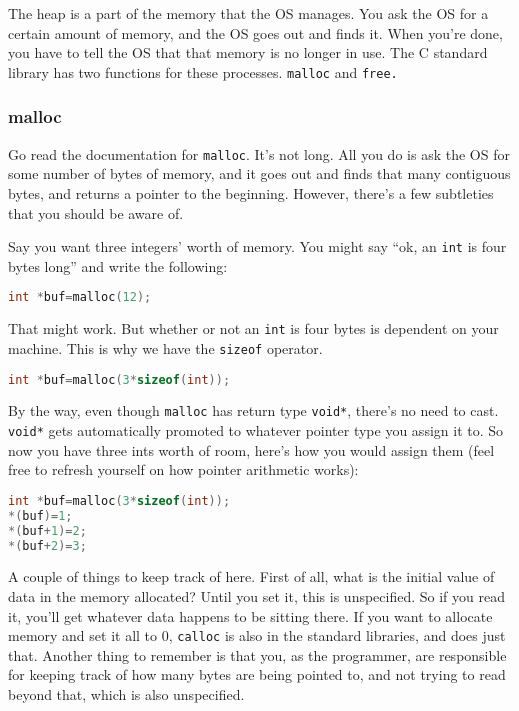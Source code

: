 \documentclass[ebook,11pt,oneside,openany]{memoir}
\begin{document}
The heap is a part of the memory that the OS manages. You ask the OS for a certain amount of memory, and the OS goes out and finds it. When you're done, you have to tell the OS that that memory is no longer in use. The C standard library has two functions for these processes. \texttt{malloc} and \texttt{free.}
\subsubsection{malloc}
Go read the documentation for \texttt{malloc}. It's not long. All you do is ask the OS for some number of bytes of memory, and it goes out and finds that many contiguous bytes, and returns a pointer to the beginning. However, there's a few subtleties that you should be aware of.

Say you want three integers' worth of memory. You might say ``ok, an \texttt{int} is four bytes long'' and write the following: 

\begin{lstlisting}[language=C]
int *buf=malloc(12);
\end{lstlisting}

That might work. But whether or not an \texttt{int} is four bytes is dependent on your machine. This is why we have the \texttt{sizeof} operator.

\begin{lstlisting}[language=C]
int *buf=malloc(3*sizeof(int));
\end{lstlisting}

By the way, even though \texttt{malloc} has return type \texttt{void*}, there's no need to cast. \texttt{void*} gets automatically promoted to whatever pointer type you assign it to. So now you have three ints worth of room, here's how you would assign them (feel free to refresh yourself on how pointer arithmetic works):

\begin{lstlisting}[language=C]
int *buf=malloc(3*sizeof(int));
*(buf)=1;
*(buf+1)=2;
*(buf+2)=3;
\end{lstlisting}


A couple of things to keep track of here. First of all, what is the initial value of data in the memory allocated? Until you set it, this is unspecified. So if you read it, you'll get whatever data happens to be sitting there. If you want to allocate memory and set it all to 0, \texttt{calloc} is also in the standard libraries, and does just that. Another thing to remember is that you, as the programmer, are responsible for keeping track of how many bytes are being pointed to, and not trying to read beyond that, which is also unspecified.
\end{document}
